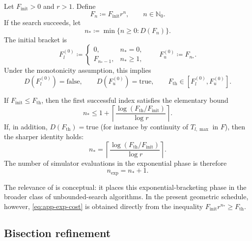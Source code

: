Let \(F_{\mathrm{init}}>0\) and \(r>1\). Define
\begin{equation}
    F_n \coloneqq F_{\mathrm{init}}r^n,
    \qquad n\in\mathbb{N}_0.
    \label{eq:app-exp-sequence}
\end{equation}
If the search succeeds, let
\begin{equation}
    n_* \coloneqq \min\{n\ge 0 : D(F_n)\}.
    \label{eq:app-exp-index}
\end{equation}
The initial bracket is
\begin{equation}
    F_l^{(0)} \coloneqq
    \begin{cases}
        0,         & n_*=0,    \\
        F_{n_*-1}, & n_*\ge 1,
    \end{cases}
    \qquad
    F_u^{(0)} \coloneqq F_{n_*}.
    \label{eq:app-initial-bracket}
\end{equation}
Under the monotonicity assumption, this implies
\[
    D(F_l^{(0)})=\mathrm{false},
    \qquad
    D(F_u^{(0)})=\mathrm{true},
    \qquad
    F_{\mathrm{th}}\in[F_l^{(0)},F_u^{(0)}].
\]

If \(F_{\mathrm{init}}\le F_{\mathrm{th}}\), then the first successful index satisfies the elementary bound
\begin{equation}
    n_*
    \le
    1+
    \left\lceil
    \frac{\log(F_{\mathrm{th}}/F_{\mathrm{init}})}{\log r}
    \right\rceil.
    \label{eq:app-exp-cost}
\end{equation}
If, in addition, \(D(F_{\mathrm{th}})=\mathrm{true}\) (for instance by continuity of \(T_{l,\max}\) in \(F\)), then the sharper identity holds:
\begin{equation}
    n_*
    =
    \left\lceil
    \frac{\log(F_{\mathrm{th}}/F_{\mathrm{init}})}{\log r}
    \right\rceil.
    \label{eq:app-exp-cost-sharp}
\end{equation}
The number of simulator evaluations in the exponential phase is therefore
\begin{equation}
    n_{\exp}=n_*+1.
\end{equation}

The relevance of \cite{Beigel_1990} is conceptual: it places this exponential-bracketing phase in the broader class of unbounded-search algorithms. In the present geometric schedule, however, \eqref{eq:app-exp-cost} is obtained directly from the inequality \(F_{\mathrm{init}}r^{n_*}\ge F_{\mathrm{th}}\).

\subsection{Bisection refinement}

